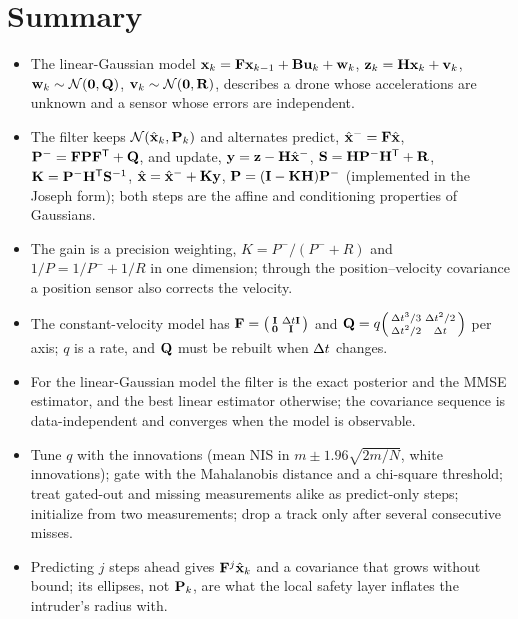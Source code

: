 \section{Summary}
\begin{summary}
\begin{itemize}
  \item The linear-Gaussian model $\mathbf{x}_k=\mathbf{F}\mathbf{x}_{k-1}+\mathbf{B}\mathbf{u}_k+\mathbf{w}_k$,
  $\mathbf{z}_k=\mathbf{H}\mathbf{x}_k+\mathbf{v}_k$, $\mathbf{w}_k\sim\mathcal{N}(\mathbf{0},\mathbf{Q})$,
  $\mathbf{v}_k\sim\mathcal{N}(\mathbf{0},\mathbf{R})$, describes a drone whose
  accelerations are unknown and a sensor whose errors are independent.
  \item The filter keeps $\mathcal{N}(\hat{\mathbf{x}}_k,\mathbf{P}_k)$ and alternates
  predict, $\hat{\mathbf{x}}^-=\mathbf{F}\hat{\mathbf{x}}$, $\mathbf{P}^-=\mathbf{F}\mathbf{P}\mathbf{F}^{\mathsf{T}}+\mathbf{Q}$,
  and update, $\mathbf{y}=\mathbf{z}-\mathbf{H}\hat{\mathbf{x}}^-$, $\mathbf{S}=\mathbf{H}\mathbf{P}^-\mathbf{H}^{\mathsf{T}}+\mathbf{R}$,
  $\mathbf{K}=\mathbf{P}^-\mathbf{H}^{\mathsf{T}}\mathbf{S}^{-1}$, $\hat{\mathbf{x}}=\hat{\mathbf{x}}^-+\mathbf{K}\mathbf{y}$,
  $\mathbf{P}=(\mathbf{I}-\mathbf{K}\mathbf{H})\mathbf{P}^-$ (implemented in the Joseph
  form); both steps are the affine and conditioning properties of Gaussians.
  \item The gain is a precision weighting, $K=P^-/(P^-+R)$ and $1/P=1/P^-+1/R$
  in one dimension; through the position--velocity covariance a position
  sensor also corrects the velocity.
  \item The constant-velocity model has $\mathbf{F}=\begin{psmallmatrix}\mathbf{I}&\Delta t\mathbf{I}\\ \mathbf{0}&\mathbf{I}\end{psmallmatrix}$
  and $\mathbf{Q}=q\begin{psmallmatrix}\Delta t^3/3&\Delta t^2/2\\ \Delta t^2/2&\Delta t\end{psmallmatrix}$
  per axis; $q$ is a rate, and $\mathbf{Q}$ must be rebuilt when $\Delta t$ changes.
  \item For the linear-Gaussian model the filter is the exact posterior and
  the MMSE estimator, and the best linear estimator otherwise; the covariance
  sequence is data-independent and converges when the model is observable.
  \item Tune $q$ with the innovations (mean NIS in $m\pm1.96\sqrt{2m/N}$,
  white innovations); gate with the Mahalanobis distance and a chi-square
  threshold; treat gated-out and missing measurements alike as predict-only
  steps; initialize from two measurements; drop a track only after several
  consecutive misses.
  \item Predicting $j$ steps ahead gives $\mathbf{F}^j\hat{\mathbf{x}}_k$ and a
  covariance that grows without bound; its ellipses, not $\mathbf{P}_k$, are
  what the local safety layer inflates the intruder's radius with.
\end{itemize}
\end{summary}

